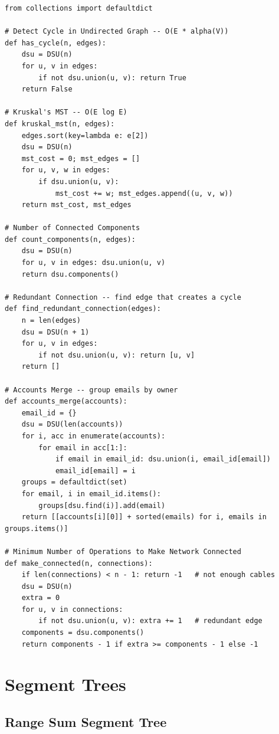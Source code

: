 \documentclass[11pt,a4paper]{report}
\begin{document}
\begin{lstlisting}
from collections import defaultdict

# Detect Cycle in Undirected Graph -- O(E * alpha(V))
def has_cycle(n, edges):
    dsu = DSU(n)
    for u, v in edges:
        if not dsu.union(u, v): return True
    return False

# Kruskal's MST -- O(E log E)
def kruskal_mst(n, edges):
    edges.sort(key=lambda e: e[2])
    dsu = DSU(n)
    mst_cost = 0; mst_edges = []
    for u, v, w in edges:
        if dsu.union(u, v):
            mst_cost += w; mst_edges.append((u, v, w))
    return mst_cost, mst_edges

# Number of Connected Components
def count_components(n, edges):
    dsu = DSU(n)
    for u, v in edges: dsu.union(u, v)
    return dsu.components()

# Redundant Connection -- find edge that creates a cycle
def find_redundant_connection(edges):
    n = len(edges)
    dsu = DSU(n + 1)
    for u, v in edges:
        if not dsu.union(u, v): return [u, v]
    return []

# Accounts Merge -- group emails by owner
def accounts_merge(accounts):
    email_id = {}
    dsu = DSU(len(accounts))
    for i, acc in enumerate(accounts):
        for email in acc[1:]:
            if email in email_id: dsu.union(i, email_id[email])
            email_id[email] = i
    groups = defaultdict(set)
    for email, i in email_id.items():
        groups[dsu.find(i)].add(email)
    return [[accounts[i][0]] + sorted(emails) for i, emails in groups.items()]

# Minimum Number of Operations to Make Network Connected
def make_connected(n, connections):
    if len(connections) < n - 1: return -1   # not enough cables
    dsu = DSU(n)
    extra = 0
    for u, v in connections:
        if not dsu.union(u, v): extra += 1   # redundant edge
    components = dsu.components()
    return components - 1 if extra >= components - 1 else -1
\end{lstlisting}

\chapter{Segment Trees}

\section{Range Sum Segment Tree}
\end{document}
